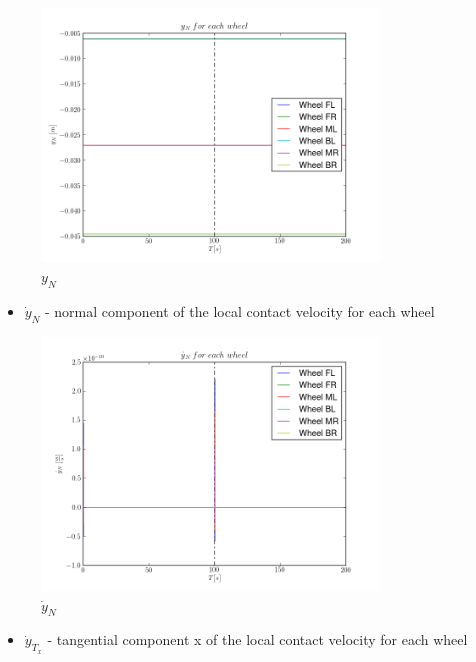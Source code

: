 \begin{figure}[H]
  \centering
    \includegraphics[width=0.8\textwidth]{yN4}
  \caption{$y_N$}
\end{figure}

\begin{itemize}
  \item $\dot{y}_{N}$ - normal component of the local contact velocity for each wheel
\end{itemize}

\begin{figure}[H]
  \centering
    \includegraphics[width=0.8\textwidth]{yNdot4}
  \caption{$\dot{y}_{N}$}
\end{figure}

\begin{itemize}
  \item $\dot{y}_{T_x}$ - tangential component x of the local contact velocity for each wheel
\end{itemize}

